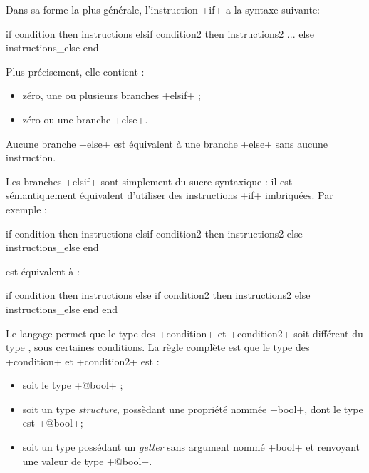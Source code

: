 Dans sa forme la plus générale, l'instruction \ggs+if+ a la syntaxe suivante:

\begin{galgasbox}
if condition then
  instructions
elsif condition2 then
  instructions2
...
else
  instructions_else
end
\end{galgasbox}


Plus précisement, elle contient :
\begin{itemize}
\item zéro, une ou plusieurs branches \ggs+elsif+ ;
\item zéro ou une branche \ggs+else+.
\end{itemize}


Aucune branche \ggs+else+ est équivalent à une branche \ggs+else+ sans aucune instruction.


Les branches \ggs+elsif+ sont simplement du sucre syntaxique : il est sémantiquement équivalent d'utiliser des instructions \ggs+if+ imbriquées. Par exemple :
\begin{galgas}
if condition then
  instructions
elsif condition2 then
  instructions2
else
  instructions_else
end
\end{galgas}

est équivalent à :
\begin{galgas}
if condition then
  instructions
else
  if condition2 then
    instructions2
  else
    instructions_else
  end
end
\end{galgas}



Le langage permet que le type des \ggs+condition+ et \ggs+condition2+ soit différent du type , sous certaines conditions. La règle complète est que le type des \ggs+condition+ et \ggs+condition2+ est :
\begin{itemize}
\item soit le type \ggs+@bool+ ;
\item soit un type \emph{structure}, possèdant une propriété nommée \ggs+bool+, dont le type est \ggs+@bool+; 
\item soit un type possédant un \emph{getter} sans argument nommé \ggs+bool+ et renvoyant une valeur de type \ggs+@bool+.
\end{itemize}

